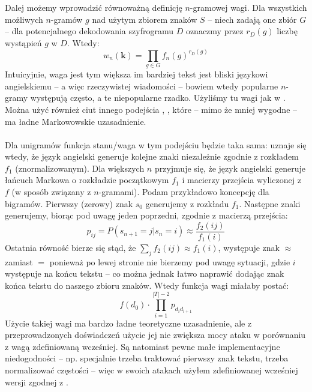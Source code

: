 \documentclass[a4paper]{article}
\theoremstyle{defn}
\theoremstyle{theorem}
\theoremstyle{lemma}
\theoremstyle{cor}
\theoremstyle{fact}
\begin{document}
Dalej możemy wprowadzić równoważną definicję $n$-gramowej wagi. Dla wszystkich możliwych $n$-gramów $g$ nad użytym zbiorem znaków $S$ – niech zadają one zbiór $G$ – dla potencjalnego dekodowania szyfrogramu $D$ oznaczmy przez $r_D(g)$ liczbę wystąpień $g$ w $D$. Wtedy:
$$w_n(\boldsymbol{k}) = \prod\limits_{g \in G} f_n(g)^{r_D(g)}$$
Intuicyjnie, waga jest tym większa im bardziej tekst jest bliski językowi angielskiemu – a więc rzeczywistej wiadomości – bowiem wtedy popularne $n$-gramy występują często, a te niepopularne rzadko. Użyliśmy tu wagi jak w \cite{Chen&Rosenthal}. Można użyć również ciut innego podejścia \cite{Connor}, \cite{Diaconis}, które – mimo że mniej wygodne – ma ładne Markowowskie uzasadnienie.\\\\
Dla unigramów funkcja stanu/waga w tym podejściu będzie taka sama: uznaje się wtedy, że język angielski generuje kolejne znaki niezależnie zgodnie z rozkładem $f_1$ (znormalizowanym). Dla większych $n$ przyjmuje się, że język angielski generuje łańcuch Markowa o rozkładzie początkowym $f_1$ i macierzy przejścia wyliczonej z $f$ (w sposób związany z $n$-gramami). Podam przykładowo koncepcję dla bigramów. Pierwszy (zerowy) znak $s_0$ generujemy z rozkładu $f_1$. Następne znaki generujemy, biorąc pod uwagę jeden poprzedni, zgodnie z macierzą przejścia:
$$p_{ij} = P(s_{n+1} = j|s_n = i) \approx \frac{f_2(ij)}{f_1(i)}$$
Ostatnia równość bierze się stąd, że $\sum_j f_2(ij) \approx f_1(i)$, występuje znak $\approx$ zamiast $=$ ponieważ po lewej stronie nie bierzemy pod uwagę sytuacji, gdzie $i$ występuje na końcu tekstu – co można jednak łatwo naprawić dodając znak końca tekstu do naszego zbioru znaków. Wtedy funkcja wagi miałaby postać:
$$ f(d_0) \cdot \prod\limits_{i=1}^{|T|-2} p_{{d_i}{d_{i+1}}} $$
Użycie takiej wagi ma bardzo ładne teoretyczne uzasadnienie, ale z przeprowadzonych doświadczeń użycie jej nie zwiększa mocy ataku w porównaniu z wagą zdefiniowaną wcześniej. Są natomiast pewne małe implementacyjne niedogodności – np. specjalnie trzeba traktować pierwszy znak tekstu, trzeba normalizować częstości – więc w swoich atakach użyłem zdefiniowanej wcześniej wersji zgodnej z \cite{Chen&Rosenthal}.\\
\end{document}
